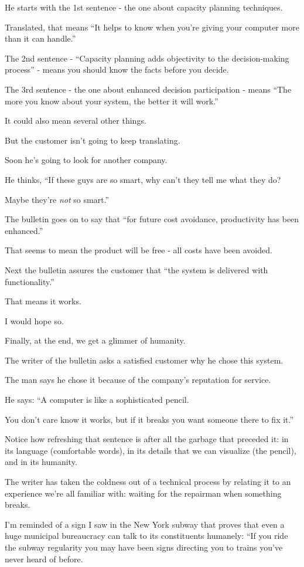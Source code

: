 \documentclass{book}
\numberwithin{equation}{section}
\begin{document}
He starts with the 1st sentence - the one about capacity planning techniques.

Translated, that means ``It helps to know when you're giving your computer more than it can handle.''

The 2nd sentence - ``Capacity planning adds objectivity to the decision-making process'' - means you should know the facts before you decide.

The 3rd sentence - the one about enhanced decision participation - means ``The more you know about your system, the better it will work.''

It could also mean several other things.

%
But the customer isn't going to keep translating.

Soon he's going to look for another company.

He thinks, ``If these guys are so smart, why can't they tell me what they do?

Maybe they're \textit{not} so smart.''

The bulletin goes on to say that ``for future cost avoidance, productivity has been enhanced.''

That seems to mean the product will be free - all costs have been avoided.

Next the bulletin assures the customer that ``the system is delivered with functionality.''

That means it works.

I would hope so.

%
Finally, at the end, we get a glimmer of humanity.

The writer of the bulletin asks a satisfied customer why he chose this system.

The man says he chose it because of the company's reputation for service.

He says: ``A computer is like a sophisticated pencil.

You don't care know it works, but if it breaks you want someone there to fix it.''

Notice how refreshing that sentence is after all the garbage that preceded it: in its language (comfortable words), in its details that we can visualize (the pencil), and in its humanity.

The writer has taken the coldness out of a technical process by relating it to an experience we're all familiar with: waiting for the repairman when something breaks.

I'm reminded of a sign I saw in the New York subway that proves that even a huge municipal bureaucracy can talk to its constituents humanely: ``If you ride the subway regularity you may have been signs directing you to trains you've never heard of before.
\end{document}
